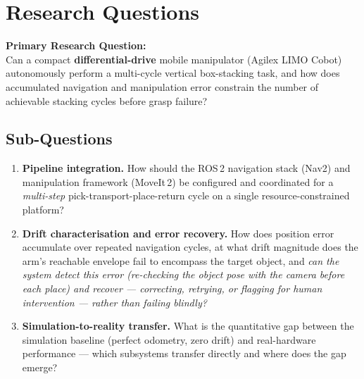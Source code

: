 \documentclass[11pt,a4paper]{article}
\begin{document}
\vspace{0.5em}

\section{Research Questions}

\begin{tcolorbox}[colback=boxbg, colframe=primary, arc=3pt, boxrule=1pt,
    left=1em, right=1em, top=1em, bottom=1em]
    \textbf{Primary Research Question:}\\[0.5em]
    Can a compact \textbf{differential-drive} mobile manipulator (Agilex LIMO Cobot)
    autonomously perform a multi-cycle vertical box-stacking task, and how does
    accumulated navigation and manipulation error constrain the number of achievable
    stacking cycles before grasp failure?
\end{tcolorbox}

\subsection{Sub-Questions}
\begin{enumerate}[label=\textbf{\arabic*.}, leftmargin=1.5em]
    \item \textbf{Pipeline integration.} How should the ROS\,2 navigation stack (Nav2)
    and manipulation framework (MoveIt\,2) be configured and coordinated for a
    \emph{multi-step} pick-transport-place-return cycle on a single resource-constrained
    platform?
    \item \textbf{Drift characterisation and error recovery.} How does position error
    accumulate over repeated navigation cycles, at what drift magnitude does the arm's
    reachable envelope fail to encompass the target object, and \emph{can the system
    detect this error (re-checking the object pose with the camera before each place)
    and recover --- correcting, retrying, or flagging for human intervention --- rather
    than failing blindly?}
    \item \textbf{Simulation-to-reality transfer.} What is the quantitative gap between
    the simulation baseline (perfect odometry, zero drift) and real-hardware performance
    --- which subsystems transfer directly and where does the gap emerge?
\end{enumerate}

\vspace{0.5em}
\end{document}

